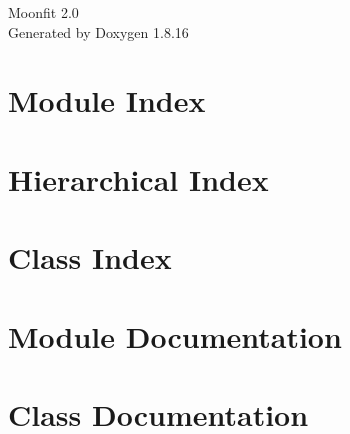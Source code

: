 \let\mypdfximage\pdfximage\def\pdfximage{\immediate\mypdfximage}\documentclass[twoside]{book}
\newcommand{\+}{\discretionary{\mbox{\scriptsize$\hookleftarrow$}}{}{}}
\newcommand{\clearemptydoublepage}{%
    \newpage{\pagestyle{empty}\cleardoublepage}%
}
\begin{document}
    \hypersetup{pageanchor=false,
    bookmarksnumbered=true,
    pdfencoding=unicode
    }
    \begin{titlepage}
        \vspace*{7cm}
        \begin{center}%
        {\Large Moonfit 2.0 }
            \\
            \vspace*{1cm}
            {\large Generated by Doxygen 1.8.16}\\
        \end{center}
    \end{titlepage}
    \clearemptydoublepage
    \tableofcontents
    \clearemptydoublepage
    \hypersetup{pageanchor=true}



    \chapter{Module Index}
    


    \chapter{Hierarchical Index}
    


    \chapter{Class Index}
    


    \chapter{Module Documentation}
    
    
    
    
    
    
    
    


    \chapter{Class Documentation}
    
    
    
    
    
    
    
    
    
    
    
    
    
    
    
    
    
    
    
    
    
    
    
    
    
    
    
    
    
    

    \backmatter
    \newpage
    \clearemptydoublepage
    \printindex
\end{document}
